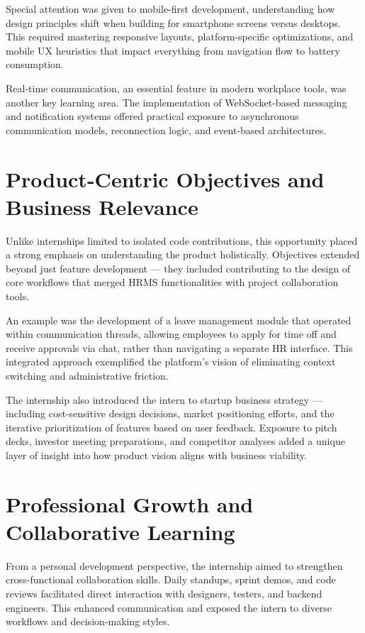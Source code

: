 Special attention was given to mobile-first development, understanding how design principles shift when building for smartphone screens versus desktops. This required mastering responsive layouts, platform-specific optimizations, and mobile UX heuristics that impact everything from navigation flow to battery consumption.

Real-time communication, an essential feature in modern workplace tools, was another key learning area. The implementation of WebSocket-based messaging and notification systems offered practical exposure to asynchronous communication models, reconnection logic, and event-based architectures.

\section{Product-Centric Objectives and Business Relevance}

Unlike internships limited to isolated code contributions, this opportunity placed a strong emphasis on understanding the product holistically. Objectives extended beyond just feature development — they included contributing to the design of core workflows that merged HRMS functionalities with project collaboration tools.

An example was the development of a leave management module that operated within communication threads, allowing employees to apply for time off and receive approvals via chat, rather than navigating a separate HR interface. This integrated approach exemplified the platform's vision of eliminating context switching and administrative friction.

The internship also introduced the intern to startup business strategy — including cost-sensitive design decisions, market positioning efforts, and the iterative prioritization of features based on user feedback. Exposure to pitch decks, investor meeting preparations, and competitor analyses added a unique layer of insight into how product vision aligns with business viability.

\section{Professional Growth and Collaborative Learning}

From a personal development perspective, the internship aimed to strengthen cross-functional collaboration skills. Daily standups, sprint demos, and code reviews facilitated direct interaction with designers, testers, and backend engineers. This enhanced communication and exposed the intern to diverse workflows and decision-making styles.

